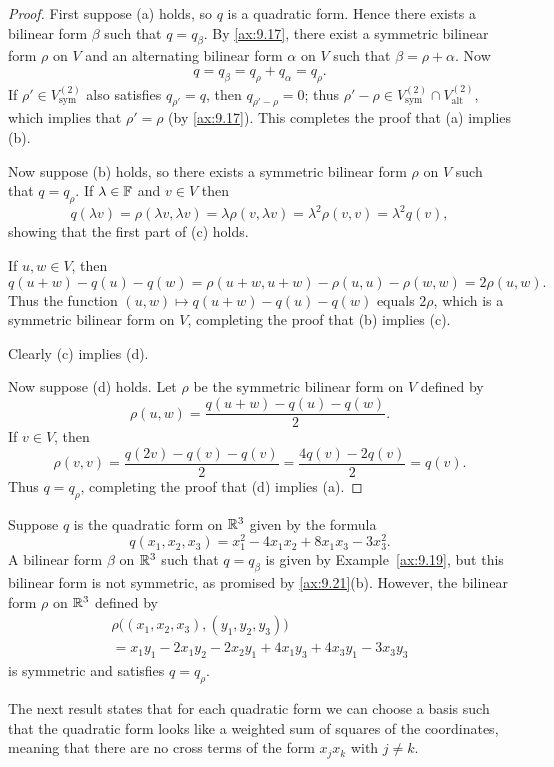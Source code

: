 \begin{proof}
First suppose (a) holds, so $q$ is a quadratic form. Hence there exists a
bilinear form $\beta$ such that $q=q_\beta$. By \ref{ax:9.17}, there exist a
symmetric bilinear form $\rho$ on $V$ and an alternating bilinear form $\alpha$
on $V$ such that $\beta=\rho+\alpha$. Now
\[ q = q_\beta = q_\rho+q_\alpha = q_\rho. \]
If $\rho'\in V_{\mathrm{sym}}^{(2)}$ also satisfies $q_{\rho'}=q$, then
$q_{\rho'-\rho}=0$; thus
$\rho'-\rho\in V_{\mathrm{sym}}^{(2)}\cap V_{\mathrm{alt}}^{(2)}$, which
implies that $\rho'=\rho$ (by \ref{ax:9.17}). This completes the proof that (a)
implies (b).

Now suppose (b) holds, so there exists a symmetric bilinear form $\rho$ on $V$
such that $q=q_\rho$. If $\lambda\in\mathbb{F}$ and $v\in V$ then
\[ q(\lambda v) = \rho(\lambda v,\lambda v) = \lambda\rho(v,\lambda v)
   = \lambda^2\rho(v,v) = \lambda^2q(v), \]
showing that the first part of (c) holds.

If $u,w\in V$, then
\[ q(u+w)-q(u)-q(w) = \rho(u+w,u+w)-\rho(u,u)-\rho(w,w) = 2\rho(u,w). \]
Thus the function $(u,w)\mapsto q(u+w)-q(u)-q(w)$ equals $2\rho$, which is a
symmetric bilinear form on $V$, completing the proof that (b) implies (c).

Clearly (c) implies (d).

Now suppose (d) holds. Let $\rho$ be the symmetric bilinear form on $V$ defined
by
\[ \rho(u,w) = \frac{q(u+w)-q(u)-q(w)}{2}. \]
If $v\in V$, then
\[ \rho(v,v) = \frac{q(2v)-q(v)-q(v)}{2} = \frac{4q(v)-2q(v)}{2} = q(v). \]
Thus $q=q_\rho$, completing the proof that (d) implies (a).
\end{proof}

\begin{example}\label{ax:9.22}
Suppose $q$ is the quadratic form on $\mathbb{R}^3$ given by the formula
\[ q(x_1,x_2,x_3) = x_1^2-4x_1x_2+8x_1x_3-3x_3^2. \]
A bilinear form $\beta$ on $\mathbb{R}^3$ such that $q=q_\beta$ is given by
Example~\ref{ax:9.19}, but this bilinear form is not symmetric, as promised by
\ref{ax:9.21}(b). However, the bilinear form $\rho$ on $\mathbb{R}^3$ defined by
\begin{multline*}
\rho\bigl((x_1,x_2,x_3),(y_1,y_2,y_3)\bigr)\\
= x_1y_1-2x_1y_2-2x_2y_1+4x_1y_3+4x_3y_1-3x_3y_3
\end{multline*}
is symmetric and satisfies $q=q_\rho$.
\end{example}

The next result states that for each quadratic form we can choose a basis such
that the quadratic form looks like a weighted sum of squares of the
coordinates, meaning that there are no cross terms of the form $x_jx_k$ with
$j\ne k$.


